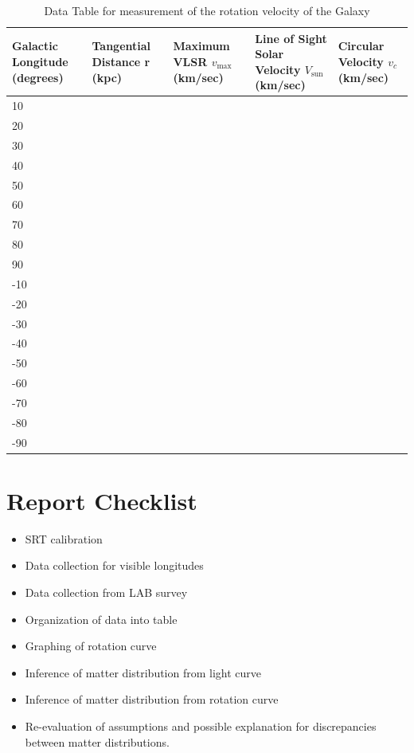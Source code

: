 \begin{table}
	\centering
	\begin{tabular}{|p{3cm}|p{3cm}|p{3cm}|p{3cm}|p{3cm}|}
		\toprule
		Galactic Longitude (degrees) & Tangential Distance r (kpc) & Maximum VLSR $v_\textrm{max}$ (km/sec) & Line of Sight Solar Velocity $V_\textrm{sun}$ (km/sec) & Circular Velocity $v_c$ (km/sec) \\ \midrule 10 & & & & \\ \midrule 20 &&&& \\ \midrule 30 &&&&\\ \midrule 40 &&&& \\ \midrule 50 &&&& \\ \midrule 60 &&&& \\ \midrule 70 &&&& \\ \midrule 80 &&&& \\ \midrule 90 &&&& \\ \midrule -10 &&&& \\ \midrule -20 &&&& \\ \midrule -30 &&&& \\ \midrule -40 &&&& \\ \midrule -50&&&& \\ \midrule -60 &&&& \\ \midrule -70 &&&& \\ \midrule -80 &&&& \\ \midrule -90 &&&& \\ \bottomrule
	\end{tabular}
	\caption{Data Table for measurement of the rotation velocity of the Galaxy}\label{sgr:tab:data}
\end{table}

\section{Report Checklist}
\begin{itemize}
	\item SRT calibration
	\item Data collection for visible longitudes
	\item Data collection from LAB survey 
	\item Organization of data into table
	\item Graphing of rotation curve 
	\item Inference of matter distribution from light curve
	\item Inference of matter distribution from rotation curve
	\item Re-evaluation of assumptions and possible explanation for discrepancies between matter distributions.
\end{itemize}












